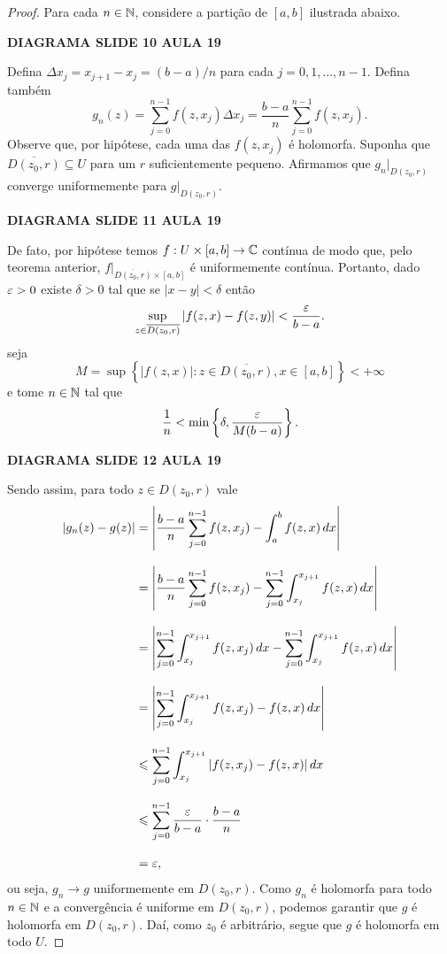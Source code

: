%
\begin{proof}
Para cada $n\in\mathbb{N}$, considere a partição de $[a,b]$ ilustrada abaixo.
%
\begin{center}
    {\bf DIAGRAMA SLIDE 10 AULA 19}
\end{center}
%
Defina $\Delta x_j = x_{j+1} - x_j = (b-a)/n$ para cada $j = 0, 1, \dots, n-1$.
Defina também
%
\[
g_n(z) = \sum_{j=0}^{n-1} f(z, x_j)\Delta x_j = \frac{b-a}{n}\sum_{j=0}^{n-1} f(z, x_j).
\]
%
Observe que, por hipótese, cada uma das $f(z, x_j)$ é holomorfa. Suponha que 
$\overline{D(z_0,r)} \subseteq U$ para um $r$ suficientemente pequeno. Afirmamos que
$g_n\big|_{D(z_0, r)}$ converge uniformemente para $g\big|_{D(z_0, r)}$.
%
\begin{center}
    {\bf DIAGRAMA SLIDE 11 AULA 19}
\end{center}
%
De fato, por hipótese temos $f:U\times[a,b]\to\mathbb{C}$ contínua de modo que, pelo teorema anterior,
$f\big|_{\overline{D(z_0, r)} \times [a,b]}$ é uniformemente contínua. Portanto, dado $\varepsilon>0$
existe $\delta > 0$ tal que se $|x - y| < \delta$ então
%
\[
\sup_{z\in\overline{D(z_0,r)}} |f(z,x) - f(z,y)| < \frac{\varepsilon}{b-a}.
\]
%
seja
%
\[
M = \sup\left\{ |f(z,x)| : z\in\overline{D(z_0,r)}, x\in[a,b] \right\} < +\infty
\]
%
e tome $n\in\mathbb{N}$ tal que
%
\[
\frac{1}{n} < \min\left\{ \delta, \frac{\varepsilon}{M(b-a)} \right\}.
\]
%
\begin{center}
    {\bf DIAGRAMA SLIDE 12 AULA 19}
\end{center}
%
Sendo assim, para todo $z\in D(z_0, r)$ vale
%
\begin{align*}
    |g_n(z) - g(z)| &= \left| \frac{b-a}{n}\sum_{j=0}^{n-1} f(z,x_j) 
                    - \int_a^b f(z,x) \, dx \right| \\[0.3cm]
                    &= \left| \frac{b-a}{n}\sum_{j=0}^{n-1} f(z,x_j) 
                    - \sum_{j=0}^{n-1}\int_{x_j}^{x_{j+1}} f(z,x) \, dx \right| \\[0.3cm]
                    &= \left| \sum_{j=0}^{n-1}\int_{x_j}^{x_{j+1}} f(z,x_j) \, dx
                    - \sum_{j=0}^{n-1}\int_{x_j}^{x_{j+1}} f(z,x) \, dx \right| \\[0.3cm]
                    &= \left| \sum_{j=0}^{n-1}\int_{x_j}^{x_{j+1}} f(z,x_j) - f(z,x) \, dx 
                    \right| \\[0.3cm]
                    &\leqslant \sum_{j=0}^{n-1}\int_{x_j}^{x_{j+1}} |f(z,x_j) - f(z,x)| \, dx \\[0.3cm]
                    &\leqslant \sum_{j=0}^{n-1} \frac{\varepsilon}{b-a}\cdot\frac{b-a}{n} \\[0.3cm]
                    &= \varepsilon,
\end{align*}
%
ou seja, $g_n\to g$ uniformemente em $D(z_0,r)$. Como $g_n$ é holomorfa para todo $n\in\mathbb{N}$
e a convergência é uniforme em $D(z_0,r)$, podemos garantir que $g$ é holomorfa em $D(z_0,r)$.
Daí, como $z_0$ é arbitrário, segue que $g$ é holomorfa em todo $U$.
\end{proof}
%